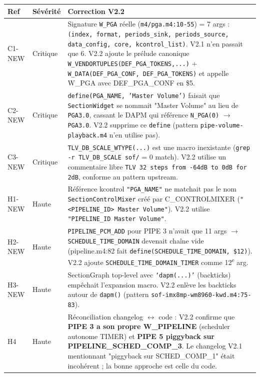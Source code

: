 \documentclass[11pt,a4paper]{article}
\begin{document}
\begin{center}
\begin{tabularx}{\textwidth}{llX}
\toprule
\textbf{Ref} & \textbf{Sévérité} & \textbf{Correction V2.2} \\
\midrule
C1-NEW & Critique & Signature \texttt{W\_PGA} réelle (\texttt{m4/pga.m4:10-55}) = 7 args : \texttt{(index, format, periods\_sink, periods\_source, data\_config, core, kcontrol\_list)}. V2.1 n'en passait que 6. V2.2 ajoute le prélude canonique \texttt{W\_VENDORTUPLES(DEF\_PGA\_TOKENS,...)} + \texttt{W\_DATA(DEF\_PGA\_CONF, DEF\_PGA\_TOKENS)} et appelle W\_PGA avec DEF\_PGA\_CONF en \$5. \\
C2-NEW & Critique & \texttt{define(PGA\_NAME, 'Master Volume')} faisait que \texttt{SectionWidget} se nommait "Master Volume" au lieu de \texttt{PGA3.0}, cassant le DAPM qui référence \texttt{N\_PGA(0)} $\rightarrow$ \texttt{PGA3.0}. V2.2 supprime ce \texttt{define} (pattern \texttt{pipe-volume-playback.m4} n'en utilise pas). \\
C3-NEW & Critique & \texttt{TLV\_DB\_SCALE\_WTYPE(...)} est une macro inexistante (\texttt{grep -r TLV\_DB\_SCALE sof/} = 0 match). V2.2 utilise un commentaire libre \texttt{TLV 32 steps from -64dB to 0dB for 2dB}, conforme au pattern upstream. \\
H1-NEW & Haute & Référence kcontrol \texttt{"PGA\_NAME"} ne matchait pas le nom \texttt{SectionControlMixer} créé par C\_CONTROLMIXER (\texttt{"<PIPELINE\_ID> Master Volume"}). V2.2 utilise \texttt{"PIPELINE\_ID Master Volume"}. \\
H2-NEW & Haute & \texttt{PIPELINE\_PCM\_ADD} pour PIPE 3 n'avait que 11 args $\rightarrow$ \texttt{SCHEDULE\_TIME\_DOMAIN} devenait chaîne vide (pipeline.m4:82 fait \texttt{define(SCHEDULE\_TIME\_DOMAIN, \$12)}). V2.2 ajoute \texttt{SCHEDULE\_TIME\_DOMAIN\_TIMER} comme 12\textsuperscript{e} arg. \\
H3-NEW & Haute & SectionGraph top-level avec \texttt{`dapm(...)'} (backticks) empêchait l'expansion macro. V2.2 enlève les backticks autour de \texttt{dapm()} (pattern \texttt{sof-imx8mp-wm8960-kwd.m4:75-83}). \\
H4 & Haute & Réconciliation changelog $\leftrightarrow$ code : V2.2 confirme que \textbf{PIPE 3 a son propre W\_PIPELINE} (scheduler autonome TIMER) et \textbf{PIPE 5 piggyback sur PIPELINE\_SCHED\_COMP\_3}. Le changelog V2.1 mentionnant "piggyback sur SCHED\_COMP\_1" était incohérent ; la bonne approche est celle du code. \\
\bottomrule
\end{tabularx}
\end{center}
\end{document}

